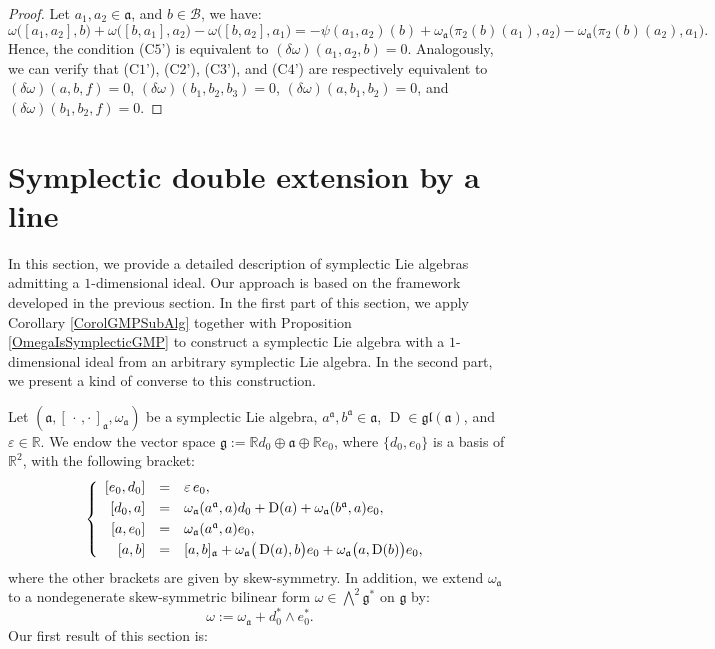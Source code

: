 \documentclass[final,1p,times,nopreprintline]{elsarticle}
\theoremstyle{definition}
\numberwithin{equation}{section}
\newcommand{\rel}{\mathbb{R}}
\newcommand{\w}{\omega}
\newcommand{\g}{\mathfrak{g}}
\newcommand{\ai}{\mathfrak{a}}
\numberwithin{equation}{section}
\newcommand{\D}{\operatorname{D}}
\newcommand{\gl}{\mathfrak{gl}}
\newcommand{\cro}{[\,\cdot\,,\cdot\,]}
\newcommand{\bi}{\mathcal{B}}
\begin{document}
\begin{proof}
Let $a_1,a_2\in\ai$, and $b\in\bi$, we have:
\begin{equation*}
\w\big([a_1,a_2],b\big)+\w\big([b,a_1],a_2\big)-\w\big([b,a_2],a_1\big)=-\psi(a_1,a_2)(b)+\w_\ai\Big(\pi_2(b)(a_1),a_2\Big)-\w_\ai\Big(\pi_2(b)(a_2),a_1\Big).
\end{equation*}
Hence, the condition (C$5$') is equivalent to $(\delta\w)(a_1,a_2,b)=0$. Analogously, we can verify that (C$1$'), (C$2$'), (C$3$'), and (C$4$') are respectively equivalent to $(\delta\w)(a,b,f)=0$, $(\delta\w)(b_1,b_2,b_3)=0$, $(\delta\w)(a,b_1,b_2)=0$, and $(\delta\w)(b_1,b_2,f)=0$.
\end{proof}


\section{Symplectic double extension by a line}\label{Ar4sect1}
In this section, we provide a detailed description of symplectic Lie algebras admitting a $1$-dimensional ideal. Our approach is based on the framework developed in the previous section. In the first part of this section, we apply Corollary \ref{CorolGMPSubAlg} together with Proposition \ref{OmegaIsSymplecticGMP} to construct a symplectic Lie algebra with a $1$-dimensional ideal from an arbitrary symplectic Lie algebra. In the second part, we present a kind of converse to this construction.

Let $(\ai,\cro_\ai, \w_\ai)$ be a symplectic Lie algebra, $a^\ai,b^\ai\in\ai$, $\D\in\gl(\ai)$, and $\varepsilon \in \rel$. We endow the vector space $\g := \rel d_0 \oplus \ai \oplus \rel e_0$, where $\{d_0,e_0\}$ is a basis of $\rel^2$, with the following bracket:
\begin{equation}\label{LiBraDobExIdeDim1Prop0}
	\left\{
	\begin{array}{r c l}\vspace{1mm}
		\left[e_0,d_0\right]&=&\varepsilon\,e_0,\\\vspace{1mm}
		\left[d_0,a\right]&=&\w_\ai(a^\ai,a)d_0+\D(a)+\w_\ai(b^\ai,a)e_0,\\ \vspace{1mm}
		\left[a,e_0\right]&=&\w_\ai(a^\ai,a)e_0,\hfill\\
		\left[a,b\right]&=&[a,b]_\ai+\w_\ai\big(\D(a),b\big)e_0+\w_\ai\big(a,\D(b)\big)e_0,\hfill
	\end{array}
	\right.\\
\end{equation}
where the other brackets are given by skew-symmetry. In addition, we  extend $\w_\ai$ to a nondegenerate skew-symmetric bilinear form $\w\in\bigwedge^2\g^*$ on $\g$ by: 
$$\w:=\w_\ai+d_0^*\wedge e_0^*.$$
Our first result of this section is:
\end{document}
